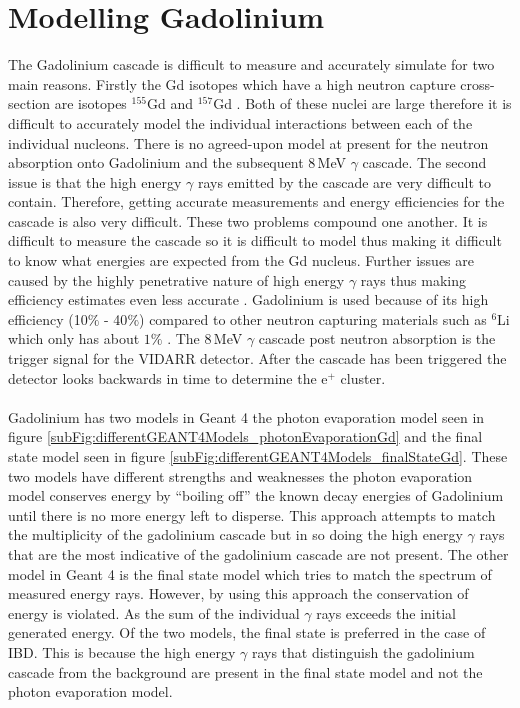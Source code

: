 \section{Modelling Gadolinium}\label{sec:GEANT4Simulation_modellingGadolinium}
The Gadolinium cascade is difficult to measure and accurately simulate for two main reasons. Firstly the Gd isotopes which have a high neutron capture cross-section are isotopes $^155$Gd and $^157$Gd \cite{molnar_2004}. Both of these nuclei are large therefore it is difficult to accurately model the individual interactions between each of the individual nucleons. There is no agreed-upon model at present for the neutron absorption onto Gadolinium and the subsequent 8\,MeV $\gamma$ cascade. The second issue is that the high energy $\gamma$ rays emitted by the cascade are very difficult to contain. Therefore, getting accurate measurements and energy efficiencies for the cascade is also very difficult. These two problems compound one another. It is difficult to measure the cascade so it is difficult to model thus making it difficult to know what energies are expected from the Gd nucleus. Further issues are caused by the highly penetrative nature of high energy $\gamma$ rays thus making efficiency estimates even less accurate \cite{molnar_2004}. Gadolinium is used because of its high efficiency (10$\%$ - 40$\%$) compared to other neutron capturing materials such as $^6$Li which only has about $1\%$ \cite{Abdushukurov_2010}. The 8\,MeV $\gamma$ cascade post neutron absorption is the trigger signal for the VIDARR detector. After the cascade has been triggered the detector looks backwards in time to determine the e$^+$ cluster.
\\\\Gadolinium has two models in Geant 4 the photon evaporation model seen in figure \ref{subFig:differentGEANT4Models_photonEvaporationGd} and the final state model seen in figure \ref{subFig:differentGEANT4Models_finalStateGd}. These two models have different strengths and weaknesses the photon evaporation model conserves energy by ``boiling off'' the known decay energies of Gadolinium until there is no more energy left to disperse. This approach attempts to match the multiplicity of the gadolinium cascade but in so doing the high energy $\gamma$ rays that are the most indicative of the gadolinium cascade are not present. The other model in Geant 4 is the final state model which tries to match the spectrum of measured energy rays. However, by using this approach the conservation of energy is violated. As the sum of the individual $\gamma$ rays exceeds the initial generated energy. Of the two models, the final state is preferred in the case of IBD. This is because the high energy $\gamma$ rays that distinguish the gadolinium cascade from the background are present in the final state model and not the photon evaporation model.

